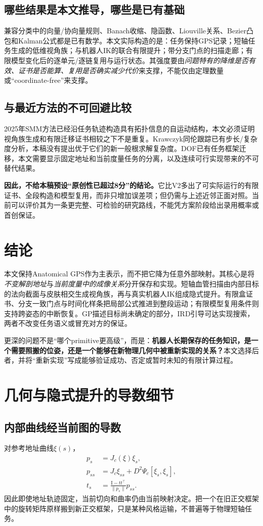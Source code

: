 \documentclass[UTF8,11pt,a4paper,fontset=fandol]{ctexart}
\numberwithin{equation}{section}
\theoremstyle{definition}
\newcommand{\Id}{\mathrm I}
\begin{document}
\subsection{哪些结果是本文推导，哪些是已有基础}
兼容分类中的向量/协向量规则、Banach收缩、隐函数、Liouville关系、Bezier凸包和Kalman公式都是已有数学。本文实际构造的是：任务保持GPS记录；短轴任务生成的低维视角族；与机器人IK的联合有限提升；带分支门点的扫描走廊；有限模型变化后的逐单元/逐链复用与运行状态。其强度要由\emph{问题特有的降维是否有效、证书是否能算、复用是否确实减少代价}来支撑，不能仅由定理数量或“coordinate-free”来支撑。

\subsection{与最近方法的不可回避比较}
2025年SMM方法已经沿任务轨迹构造具有拓扑信息的自运动结构，本文必须证明视角族生成和有限迁移证书相较之下不是重复\cite{smm2025}。Krawczyk同伦跟踪已有步长/复杂度分析，本稿没有提出优于它们的新一般根求解复杂度\cite{krawczyk2025}。DOF已有任务框架迁移，本文需要显示固定地址和当前度量任务的分离，以及连续可行实现带来的不可替代结果\cite{dof2026}。

\textbf{因此，不给本稿预设“原创性已超过8分”的结论。}它比V2多出了可实际运行的有限证书、全段构造和模型复用，而非只增加误差项；但仍需与上述近邻正面对照。当前可以评价其为一条更完整、可检验的研究路线，不能凭方案阶段给出录用概率或首创保证。

\section{结论}
本文保持Anatomical GPS作为主表示，而不把它降为任意外部映射。其核心是将\emph{不变解剖地址}与\emph{当前度量中的成像关系}分开保存和实现。短轴血管扫描由内部目标的法向截面与皮肤相交生成视角族，再与真实机器人IK组成隐式提升。有限盒证书、分支一致门点与时间化样条把局部公式推进到整段运动；有限模型复用条件则支持跨姿态的中断恢复。GP描述目标尚未确定的部分，IRD引导可达实现搜索，两者不改变任务语义或冒充对方的保证。

更深的问题不是“哪个primitive更高级”，而是：\textbf{机器人长期保存的任务知识，是一个需要照搬的位姿，还是一个能够在新物理几何中被重新实现的关系？}本文选择后者，并将“重新实现”写成能够验证成功、否定或暂时未知的有限计算过程。

\appendix
\section{几何与隐式提升的导数细节}
\subsection{内部曲线经当前图的导数}
对参考地址曲线$\xi(s)$，
\begin{align}
 p_s&=J_c(\xi)\xi_s,\\
 p_{ss}&=J_c\xi_{ss}+D^2\Psi_c[\xi_s,\xi_s],\\
 t_s&=\frac{\Id-tt^\top}{\|p_s\|}p_{ss}.
\end{align}
因此即使地址轨迹固定，当前切向和曲率仍由当前映射决定。把一个在旧正交框架中的旋转矩阵原样搬到新正交框架，只是某种风格运输，不普遍等于物理短轴任务。
\end{document}
